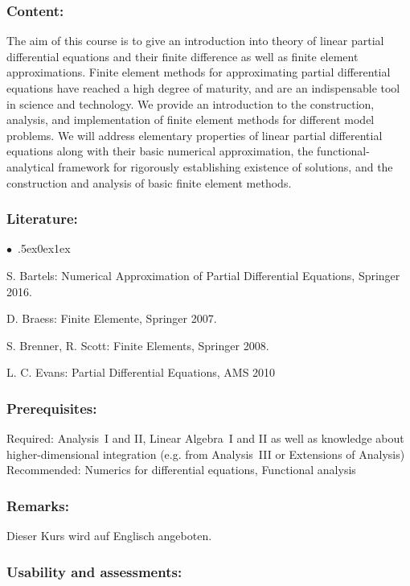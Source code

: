 \documentclass[a4paper,10pt]{article}
\renewenvironment{itemize}{\begin{list}{$\bullet$\ }{\itemsep.5ex\setlength{\topsep}{0.5\itemsep}\parsep0ex\labelsep1ex\settowidth{\labelwidth}{$\bullet$\ }\setlength{\leftmargin}{\labelwidth}\addtolength{\leftmargin}{3ex}\addtolength{\leftmargin}{\labelsep}}}{\end{list}}
\begin{document}
\subsubsection*{\large
    Content:
}
The aim of this course is to give an introduction into theory of linear partial differential equations and their finite difference as well as finite element approximations. Finite element methods for approximating partial differential equations have reached a high degree of maturity, and are an indispensable tool in science and technology. We provide an introduction to the construction, analysis, and implementation of finite element methods for different model problems. We will address elementary properties of linear partial differential equations along with their basic numerical approximation, the functional-analytical framework for rigorously establishing existence of solutions, and the construction and analysis of basic finite element methods.
\subsubsection*{\large
    Literature:
}
\begin{itemize}
\item  S. Bartels: Numerical Approximation of Partial Differential Equations, Springer 2016. 
\item  D. Braess: Finite Elemente, Springer 2007. 
\item  S. Brenner, R. Scott: Finite Elements, Springer 2008. 
\item  L. C. Evans: Partial Differential Equations, AMS 2010
\end{itemize}
\subsubsection*{\large
    Prerequisites:
}
Required: Analysis~I and II, Linear Algebra~I and II as well as knowledge about higher-dimensional integration (e.g. from Analysis~III or Extensions of Analysis) \\
Recommended:  Numerics for differential equations, Functional analysis
\subsubsection*{\large
    Remarks:
}
Dieser Kurs wird auf Englisch angeboten.
\cleardoublepage
\subsubsection*{\large
    Usability and assessments:
}
\end{document}
